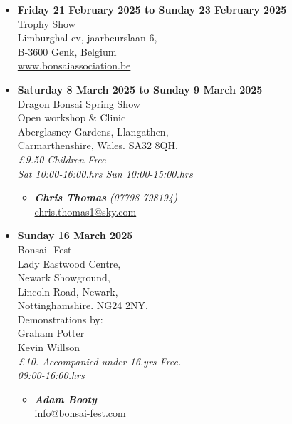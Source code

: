 \begin{itemize}
    \item \textbf{Friday 21 February 2025 to Sunday 23 February 2025}
    \\
    Trophy Show \\
    Limburghal cv, jaarbeurslaan 6, \\
    B-3600 Genk, Belgium
    \\
    \href{http://www.bonsaiassociation.be/}{www.bonsaiassociation.be}

    \item \textbf{Saturday 8 March 2025 to Sunday 9 March 2025}
    \\
    Dragon Bonsai Spring Show \\
    Open workshop \& Clinic \\
    Aberglasney Gardens, Llangathen, \\
    Carmarthenshire, Wales. SA32 8QH.
    \\
    \emph{£9.50 Children Free} \\
    \emph{Sat 10:00-16:00.hrs Sun 10:00-15:00.hrs}
    \begin{itemize}
        \item \textbf{\emph{Chris Thomas}} \emph{(07798 798194)} \\
        \href{mailto:chris.thomas1@sky.com}{chris.thomas1@sky.com} 
    \end{itemize}

    \item \textbf{Sunday 16 March 2025}
    \\
    Bonsai -Fest \\
    Lady Eastwood Centre, \\
    Newark Showground, \\
    Lincoln Road, Newark, \\
    Nottinghamshire. NG24 2NY. \\
    Demonstrations by: \\
    Graham Potter \\
    Kevin Willson
    \\
    \emph{£10. Accompanied under 16.yrs Free.} \\
    \emph{09:00-16:00.hrs}
    \begin{itemize}
        \item \textbf{\emph{Adam Booty}} \\
        \href{mailto:info@bonsai-fest.com}{info@bonsai-fest.com} 
    \end{itemize}


\end{itemize}

